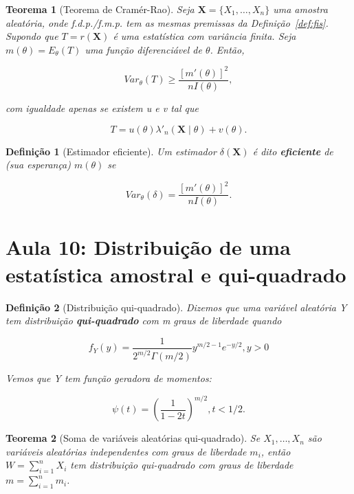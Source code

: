 \documentclass{article}
\newtheorem{theorem}{Teorema}
\newtheorem{definition}{Definição}
\begin{document}
	\begin{theorem}[Teorema de Cramér-Rao]
		Seja $\textbf{X} = \{ X_1, \ldots, X_n \}$ uma amostra aleatória, onde f.d.p./f.m.p. tem as mesmas premissas da Definição~\ref{def:fis}. Supondo que $T = r(\textbf{X})$ é uma estatística com variância finita. Seja $m(\theta) = E_\theta(T)$ uma função diferenciável de $\theta$. Então,
		
		\begin{equation}
			Var_\theta(T) \geq \frac{[m'(\theta)]^2}{n I(\theta)},
		\end{equation}
		
		com igualdade apenas se existem u e v tal que
		
		$$T = u(\theta) \lambda'_n (\textbf{X} \mid \theta) + v(\theta).$$
	\end{theorem}
	
	\begin{definition}[Estimador eficiente]
		Um estimador $\delta(\textbf{X})$ é dito \textbf{eficiente} de (sua esperança) $m(\theta)$ se
		
		$$Var_\theta(\delta) = \frac{[m'(\theta)]^2}{n I(\theta)}.$$
	\end{definition}
	
	\section*{Aula 10: Distribuição de uma estatística amostral e qui-quadrado}
	\label{s10}
	\begin{definition}[Distribuição qui-quadrado]
		Dizemos que uma variável aleatória Y tem distribuição \textbf{qui-quadrado} com m graus de liberdade quando
		
		\begin{equation}
			f_Y(y) = \frac{1}{2^{m/2} \Gamma(m/2)} y^{m/2 - 1} e^{-y/2}, y > 0
		\end{equation}
		
		Vemos que Y tem função geradora de momentos:
		
		$$\psi (t) = \left ( \frac{1}{1 - 2t} \right )^{m/2}, t < 1/2.$$
	\end{definition}
	
	\begin{theorem}[Soma de variáveis aleatórias qui-quadrado]
		Se $X_1, \ldots, X_n$ são variáveis aleatórias independentes com graus de liberdade $m_i$, então $W = \sum_{i = 1}^n X_i$ tem distribuição qui-quadrado com graus de liberdade $m = \sum_{i = 1}^n m_i$.
	\end{theorem}
	
\end{document}
